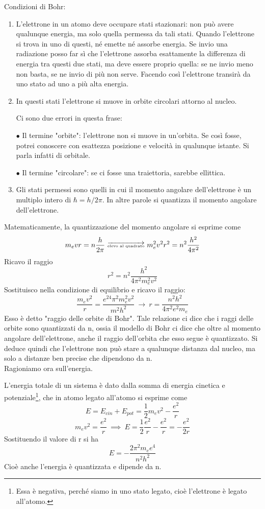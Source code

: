 Condizioni di Bohr:
\begin{enumerate}
  \item L'elettrone in un atomo deve occupare stati stazionari: non può avere qualunque energia, ma solo quella permessa da tali stati. Quando l'elettrone si trova in uno di questi, né emette né assorbe energia. Se invio una radiazione posso far sì che l'elettrone assorba esattamente la differenza di energia tra questi due stati, ma deve essere proprio quella: se ne invio meno non basta, se ne invio di più non serve.
  Facendo così l'elettrone transirà da uno stato ad uno a più alta energia.
  \item In questi stati l'elettrone si muove in orbite circolari attorno al nucleo.
  
  Ci sono due errori in questa frase:

  $\bullet$ Il termine "orbite": l'elettrone non si muove in un'orbita. Se così fosse, potrei conoscere con esattezza posizione e velocità in qualunque istante. Si parla infatti di orbitale.

  $\bullet$ Il termine "circolare": se ci fosse una traiettoria, sarebbe ellittica.
  \item Gli stati permessi sono quelli in cui il momento angolare dell'elettrone è un multiplo intero di $\hbar=h/2\pi$. In altre parole si quantizza il momento angolare dell'elettrone. 
\end{enumerate}
Matematicamente, la quantizzazione del momento angolare si esprime come
$$m_evr=n\frac{h}{2\pi}\ \overrightarrow{\tiny\text{elevo al quadrato}}\ m_e^2v^2r^2=n^2\frac{h^2}{4\pi^2}$$
Ricavo il raggio
$$r^2=n^2\frac{h^2}{4\pi^2m_e^2v^2}$$
Sostituisco nella condizione di equilibrio e ricavo il raggio:
$$\frac{m_ev^2}{r}=\frac{e^24\pi^2m_e^2v^2}{m^2h^2}\ \rightarrow\ r=\frac{n^2h^2}{4\pi^2e^2m_e}$$
Esso è detto "raggio delle orbite di Bohr".
Tale relazione ci dice che i raggi delle orbite sono quantizzati da n, ossia il modello di Bohr ci dice che oltre al momento angolare dell'elettrone, anche il raggio dell'orbita che esso segue è quantizzato. Si deduce quindi che l'elettrone non può stare a qualunque distanza dal nucleo, ma solo a distanze ben precise che dipendono da n.\\
Ragioniamo ora sull'energia.

L'energia totale di un sistema è dato dalla somma di energia cinetica e potenziale\footnote{Essa è negativa, perché siamo in uno stato legato, cioè l'elettrone è legato all'atomo.}, che in atomo legato all'atomo si esprime come
$$E=E_{cin} + E_{pot}=\frac{1}{2}m_ev^2 - \frac{e^2}{r}$$
$$m_ev^2=\frac{e^2}{r}\ \implies\ E=\frac{1}{2}\frac{e^2}{r} - \frac{e^2}{r}=- \frac{e^2}{2r}$$
Sostituendo il valore di r si ha
$$E=-\frac{2\pi^2m_ee^4}{n^2h^2}$$
Cioè anche l'energia è quantizzata e dipende da n.

